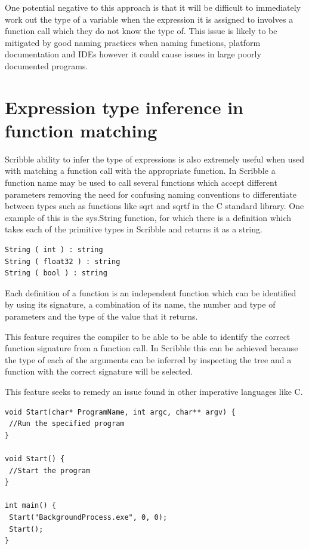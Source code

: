 \documentclass[]{final_report}
\begin{document}
One potential negative to this approach is that it will be difficult to immediately work out the type of a variable when the expression it is assigned to involves a function call which they do not know the type of. This issue is likely to be mitigated by good naming practices when naming functions, platform documentation and IDEs however it could cause issues in large poorly documented programs.

\section{Expression type inference in function matching}

Scribble ability to infer the type of expressions is also extremely useful when used with matching a function call with the appropriate function. In Scribble a function name may be used to call several functions which accept different parameters removing the need for confusing naming conventions to differentiate between types such as functions like sqrt and sqrtf in the C standard library. One example of this is the sys.String function, for which there is a definition which takes each of the primitive types in Scribble and returns it as a string.

\begin{verbatim}
String ( int ) : string
String ( float32 ) : string
String ( bool ) : string
\end{verbatim}

Each definition of a function is an independent function which can be identified by using its signature, a combination of its name, the number and type of parameters and the type of the value that it returns.

This feature requires the compiler to be able to be able to identify the correct function signature from a function call. In Scribble this can be achieved because the type of each of the arguments can be inferred by inspecting the tree and a function with the correct signature will be selected.

This feature seeks to remedy an issue found in other imperative languages like C.

\begin{verbatim}
void Start(char* ProgramName, int argc, char** argv) {
 //Run the specified program
}

void Start() {
 //Start the program
}

int main() {
 Start("BackgroundProcess.exe", 0, 0);
 Start();
}
\end{verbatim}
\end{document}
